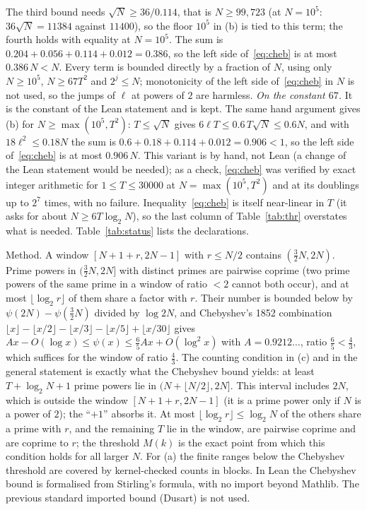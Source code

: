 \documentclass[11pt]{article}
\theoremstyle{definition}
\theoremstyle{remark}
\begin{document}
{The third bound needs $\sqrt N\ge36/0.114$, that is $N\ge99{,}723$ (at $N=10^5$: $36\sqrt N=11384$ against $11400$), so the floor $10^5$ in (b) is tied to this term; the fourth holds with equality at $N=10^5$. The sum is $0.204+0.056+0.114+0.012=0.386$, so the left side of~\eqref{eq:cheb} is at most $0.386\,N<N$. Every term is bounded directly by a fraction of $N$, using only $N\ge10^5$, $N\ge67T^2$ and $2^j\le N$; monotonicity of the left side of~\eqref{eq:cheb} in $N$ is not used, so the jumps of $\ell$ at powers of $2$ are harmless. \emph{On the constant $67$.} It is the constant of the Lean statement and is kept. The same hand argument gives (b) for $N\ge\max(10^5,T^2)$: $T\le\sqrt N$ gives $6\ell T\le0.6\,T\sqrt N\le0.6N$, and with $18\ell^2\le0.18N$ the sum is $0.6+0.18+0.114+0.012=0.906<1$, so the left side of~\eqref{eq:cheb} is at most $0.906\,N$. This variant is by hand, not Lean (a change of the Lean statement would be needed); as a check, \eqref{eq:cheb} was verified by exact integer arithmetic for $1\le T\le30000$ at $N=\max(10^5,T^2)$ and at its doublings up to $2^7$ times, with no failure. Inequality~\eqref{eq:cheb} is itself near-linear in $T$ (it asks for about $N\ge6T\log_2N$), so the last column of Table~\ref{tab:thr} overstates what is needed. Table~\ref{tab:status} lists the declarations.\par} Method. A window $[N+1+r,2N-1]$ with $r\le N/2$ contains $(\frac32N,2N)$. Prime powers in $(\frac32N,2N]$ with distinct primes are pairwise coprime (two prime powers of the same prime in a window of ratio $<2$ cannot both occur), and at most $\lfloor\log_2r\rfloor$ of them share a factor with $r$. Their number is bounded below by $\psi(2N)-\psi(\frac32N)$ divided by $\log2N$, and Chebyshev's 1852 combination $\lfloor x\rfloor-\lfloor x/2\rfloor-\lfloor x/3\rfloor-\lfloor x/5\rfloor+\lfloor x/30\rfloor$ gives $Ax-O(\log x)\le\psi(x)\le\frac65Ax+O(\log^2x)$ with $A=0.9212\ldots$, ratio $\frac65<\frac43$, which suffices for the window of ratio $\frac43$. The counting condition in (c) and in the general statement is exactly what the Chebyshev bound yields: at least $T+\log_2N+1$ prime powers lie in $(N+\lfloor N/2\rfloor,2N]$. This interval includes $2N$, which is outside the window $[N+1+r,2N-1]$ (it is a prime power only if $N$ is a power of $2$); the ``$+1$'' absorbs it. At most $\lfloor\log_2r\rfloor\le\log_2N$ of the others share a prime with $r$, and the remaining $T$ lie in the window, are pairwise coprime and are coprime to $r$; the threshold $M(k)$ is the exact point from which this condition holds for all larger $N$. For (a) the finite ranges below the Chebyshev threshold are covered by kernel-checked counts in blocks. In Lean the Chebyshev bound is formalised from Stirling's formula, with no import beyond Mathlib. The previous standard imported bound (Dusart) is not used.
\end{document}
